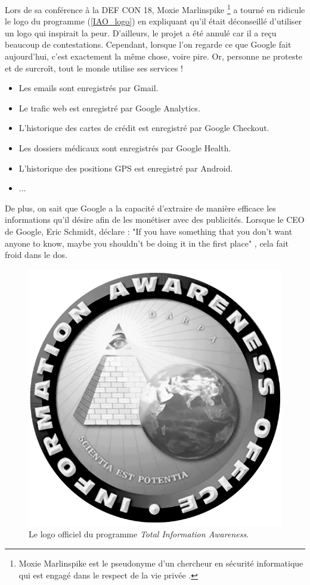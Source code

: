 Lors de sa conférence à la DEF CON 18, Moxie Marlinspike \footnote{Moxie Marlinspike est le pseudonyme d'un chercheur en sécurité informatique qui est engagé dans le respect de la vie privée \cite{site_perso_moxie_marlinspike}.} a tourné en ridicule le logo du programme (\autoref{IAO_logo}) en expliquant qu'il était déconseillé d'utiliser un logo qui inspirait la peur. D'ailleurs, le projet a été annulé car il a reçu beaucoup de contestations. Cependant, lorsque l'on regarde ce que Google fait aujourd'hui, c'est exactement la même chose, voire pire. Or, personne ne proteste et de surcroît, tout le monde utilise ses services !
\begin{itemize}
  \item Les emails sont enregistrés par Gmail.
  \item Le trafic web est enregistré par Google Analytics.
  \item L'historique des cartes de crédit est enregistré par Google Checkout.
  \item Les dossiers médicaux sont enregistrés par Google Health.
  \item L'historique des positions GPS est enregistré par Android.
  \item ...
\end{itemize}
De plus, on sait que Google a la capacité d'extraire de manière efficace les informations qu'il désire afin de les monétiser avec des publicités. Lorsque le CEO de Google, Eric Schmidt, déclare : "If you have something that you don't want anyone to know, maybe you shouldn't be doing it in the first place" \cite{privacy_eric_schmidt}, cela fait froid dans le dos.

\begin{figure}[h]
	\centering
	\includegraphics[scale=0.2]{figures/IAO-logo_NB.png}
	\caption{\label{IAO_logo}Le logo officiel du programme \textit{Total Information Awareness}.}
\end{figure}

